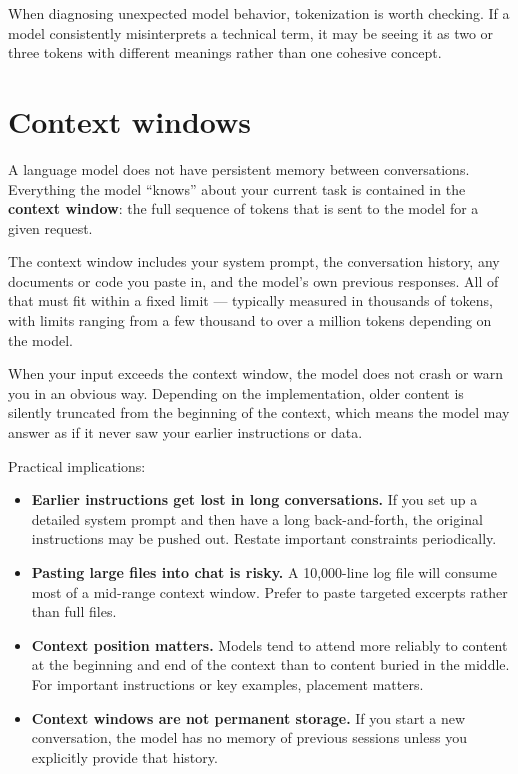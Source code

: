
When diagnosing unexpected model behavior, tokenization is worth checking. If a model consistently misinterprets a technical term, it may be seeing it as two or three tokens with different meanings rather than one cohesive concept.

\section{Context windows}

A language model does not have persistent memory between conversations. Everything the model ``knows'' about your current task is contained in the \textbf{context window}: the full sequence of tokens that is sent to the model for a given request.

The context window includes your system prompt, the conversation history, any documents or code you paste in, and the model's own previous responses. All of that must fit within a fixed limit --- typically measured in thousands of tokens, with limits ranging from a few thousand to over a million tokens depending on the model.

When your input exceeds the context window, the model does not crash or warn you in an obvious way. Depending on the implementation, older content is silently truncated from the beginning of the context, which means the model may answer as if it never saw your earlier instructions or data.

Practical implications:

\begin{itemize}[noitemsep,topsep=0pt]
  \item \textbf{Earlier instructions get lost in long conversations.} If you set up a detailed system prompt and then have a long back-and-forth, the original instructions may be pushed out. Restate important constraints periodically.
  \item \textbf{Pasting large files into chat is risky.} A 10,000-line log file will consume most of a mid-range context window. Prefer to paste targeted excerpts rather than full files.
  \item \textbf{Context position matters.} Models tend to attend more reliably to content at the beginning and end of the context than to content buried in the middle. For important instructions or key examples, placement matters.
  \item \textbf{Context windows are not permanent storage.} If you start a new conversation, the model has no memory of previous sessions unless you explicitly provide that history.
\end{itemize}

